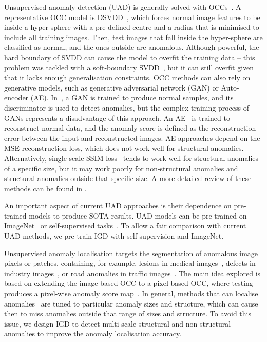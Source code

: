 \documentclass[letterpaper]{article} \usepackage{aaai22}  \usepackage{times}  \usepackage{helvet}  \usepackage{courier}  \usepackage[hyphens]{url}  \usepackage{graphicx} \urlstyle{rm} \def\UrlFont{\rm}  \usepackage{natbib}  \usepackage{caption} \DeclareCaptionStyle{ruled}{labelfont=normalfont,labelsep=colon,strut=off} \frenchspacing  \setlength{\pdfpagewidth}{8.5in}  \setlength{\pdfpageheight}{11in}  \usepackage{algorithm}
\begin{document}
\label{sec:unsupervised_anomaly_detection}
Unsupervised anomaly detection (UAD) is generally solved with OCCs~\cite{li2021cutpaste,tian2021constrained,tian2020few,tian2021weakly,dsvdd,bergmann2020uninformed,ocgan,Salehi_2021_CVPR,Wang_2021_CVPR,tian2021selfsupervised,bergman2020classification,golan2018deep,defard2021padim,Zavrtanik_2021_ICCV,wang2016s}.
A representative OCC model is DSVDD~\cite{dsvdd}, which forces normal image features to be inside a hyper-sphere with a pre-defined centre and a radius that is minimised to include all training images. Then, test images that fall inside the  hyper-sphere are classified as normal, and the ones outside are anomalous.
Although powerful, the hard boundary of SVDD can cause the model to overfit the training data -- this problem was tackled with a soft-boundary SVDD~\cite{dsvdd}, but it can still overfit given that it lacks enough generalisation constraints. 
OCC methods can also rely on generative models, such as generative adversarial network (GAN) or Auto-encoder (AE).
In~\cite{ocgan}, a GAN is trained to produce normal samples, and its discriminator is used to detect anomalies, but the complex training process of GANs represents a disadvantage of this approach.
An AE~\cite{ionescu2019object,gong2019memorizing,nguyen2019anomaly,sabokrou2017deep,sabokrou2018adversarially,venkataramanan2019attention} is trained to reconstruct normal data, and the anomaly score is defined as the reconstruction error between the input and reconstructed images.  AE approaches depend on the MSE reconstruction loss, which does not work well for structural anomalies.  Alternatively, single-scale SSIM loss~\cite{ae-ssim} tends to work well for structural anomalies of a specific size, but it may work poorly for non-structural anomalies and structural anomalies outside that specific size. A more detailed review of these methods can be found in \cite{pang2021deep}.

An important aspect of current UAD approaches is their dependence on pre-trained models to produce SOTA results. UAD models can be pre-trained on ImageNet~\cite{venkataramanan2019attention,bergmann2020uninformed} or self-supervised tasks~\cite{golan2018deep,bergman2020classification}.
To allow a fair comparison with current UAD methods, we pre-train IGD with self-supervision and ImageNet.




Unsupervised anomaly localisation targets the segmentation of anomalous image pixels or patches, containing, for example, lesions in medical images~\cite{Li_2019_CVPR}, defects in industry images~\cite{mvtecad,bergmann2020uninformed}, or road anomalies in traffic images~\cite{pathak2015anomaly,tian2021pixel}.
The main idea explored is based on extending the image based OCC to a pixel-based OCC, where testing produces a pixel-wise anomaly score map~\cite{baur2018deep,ae-ssim}. 
In general, methods that can localise anomalies~\cite{venkataramanan2019attention, bergmann2020uninformed} are tuned to particular anomaly sizes and structure, which can cause then to miss anomalies outside that range of sizes and structure.  
To avoid this issue, we design IGD to detect multi-scale structural and non-structural anomalies to improve the anomaly localisation accuracy.
\end{document}
